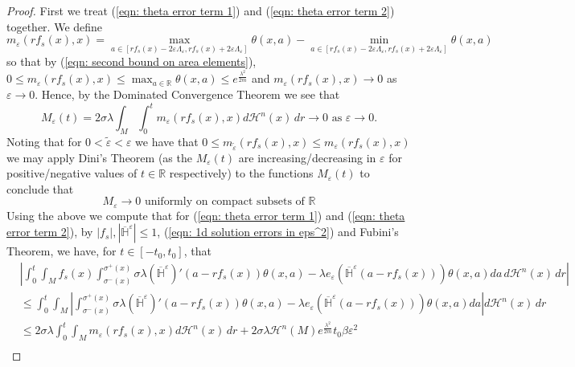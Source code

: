 \documentclass[11pt]{article}
\begin{document}
\begin{proof}
First we treat (\ref{eqn: theta error term 1}) and (\ref{eqn: theta error term 2}) together. We define
\begin{equation*}
    m_\varepsilon(rf_s(x),x) = \max_{a \in [rf_s(x) - 2\varepsilon\Lambda_\varepsilon,rf_s(x) + 2\varepsilon\Lambda_\varepsilon]} \theta(x,a) - \min_{a \in [rf_s(x) - 2\varepsilon\Lambda_\varepsilon,rf_s(x) + 2\varepsilon\Lambda_\varepsilon]} \theta(x,a)
\end{equation*}
so that by (\ref{eqn: second bound on area elements}), $0 \leq m_\varepsilon(rf_s(x),x) \leq \max_{a \in\mathbb{R}}\theta(x,a) \leq e^\frac{\lambda^2}{2m}$ and $m_\varepsilon(rf_s(x),x) \rightarrow 0$ as $\varepsilon \rightarrow 0$. Hence, by the Dominated Convergence Theorem we see that
\begin{equation*}
   M_\varepsilon(t) = 2\sigma\lambda \int_M \int_0^t m_\varepsilon(rf_s(x),x)d\mathcal{H}^n(x) \, dr \rightarrow 0 \text{ as } \varepsilon \rightarrow 0.
\end{equation*}
Noting that for $0 < \tilde{\varepsilon} < \varepsilon$ we have that $0 \leq m_{\tilde{\varepsilon}}(rf_s(x),x) \leq m_\varepsilon(rf_s(x),x)$ we may apply Dini's Theorem (as the $M_\varepsilon(t)$ are increasing/decreasing in $\varepsilon$ for positive/negative values of $t \in \mathbb{R}$ respectively) to the functions $M_\varepsilon(t)$ to conclude that 
\begin{equation}\label{eqn: M term uniform null on compact sets}
    M_\varepsilon \rightarrow 0 \text{ uniformly on compact subsets of } \mathbb{R}
\end{equation}
Using the above we compute that for (\ref{eqn: theta error term 1}) and (\ref{eqn: theta error term 2}), by $|f_s|,|\overline{\mathbb{H}}^\varepsilon| \leq 1$, (\ref{eqn: 1d solution errors in eps^2}) and  Fubini's Theorem, we have, for $t \in [-t_0,t_0]$, that 
\begin{align*}
    &\left|\int_0^t \int_M f_s(x) \int_{\sigma^-(x)}^{\sigma^+(x)} \sigma\lambda  (\overline{\mathbb{H}}^\varepsilon)'(a - rf_s(x))\theta(x,a)
   - \lambda e_\varepsilon(\overline{\mathbb{H}}^\varepsilon(a - rf_s(x))) \theta(x,a) da \, d\mathcal{H}^n(x) \, dr \right|\\
   &\leq \int_0^t \int_M \left|\int_{\sigma^-(x)}^{\sigma^+(x)}  \sigma\lambda  (\overline{\mathbb{H}}^\varepsilon)'(a - rf_s(x))\theta(x,a)
   - \lambda e_\varepsilon(\overline{\mathbb{H}}^\varepsilon(a - rf_s(x))) \theta(x,a) da \right| d\mathcal{H}^n(x) \, dr\\
   &\leq 2\sigma\lambda \int_0^t \int_M  m_\varepsilon(rf_s(x),x) d\mathcal{H}^n(x) \, dr +  2\sigma\lambda\mathcal{H}^n(M)e^\frac{\lambda^2}{2m}t_0\beta \varepsilon^2\\

\end{align*}
\end{proof}
\end{document}
